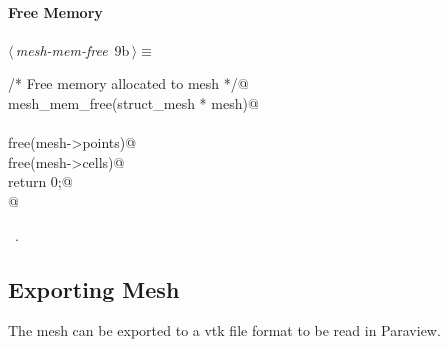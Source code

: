 \documentclass[a4paper,11pt]{article}
\begin{document}
\paragraph{Free Memory}
\begin{flushleft} \small
\begin{minipage}{\linewidth}\label{scrap8}\raggedright\small
{} $\langle\,${\itshape mesh-mem-free}\nobreak\ {\footnotesize {9b}}$\,\rangle\equiv$
\vspace{-1ex}
\begin{list}{}{} \item
\mbox{}\verb@/* Free memory allocated to mesh */@\\
\mbox{}\verb@int mesh_mem_free(struct_mesh * mesh){@\\
\mbox{}\verb@@\\
\mbox{}\verb@   free(mesh->points)@\\
\mbox{}\verb@   free(mesh->cells)@\\
\mbox{}\verb@   return 0;@\\
\mbox{}\verb@}@\\
\mbox{}\verb@@{\NWsep}
\end{list}
\vspace{-1.5ex}
\footnotesize
\begin{list}{}{\setlength{\itemsep}{-\parsep}\setlength{\itemindent}{-\leftmargin}}
\item \NWtxtMacroRefIn\ .

\item{}
\end{list}
\end{minipage}\vspace{4ex}
\end{flushleft}
\subsection{Exporting Mesh}
The mesh can be exported to a vtk file format to be read in Paraview.
\end{document}
